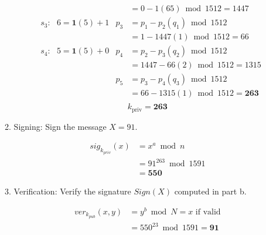 \documentclass[12pt]{article}
\newenvironment{answer}
{ \begin{tcolorbox}[halign=left]
    }
    {  
  \end{tcolorbox}
}
\begin{document}
\begin{enumerate}
\begin{enumerate}
\begin{answer}
\begin{align*}
          & & &= 0 - 1(65) \bmod 1512 = 1447 \\
          &s_3: \text{  }6 = \bm{1}(5) + 1 &p_3 &= p_1 - p_2(q_1) \bmod 1512 \\ 
          & & &= 1 - 1447(1) \bmod 1512 = 66 \\
          &s_4: \text{  }5 = \bm{1}(5) + 0 &p_4 &= p_2 - p_3(q_2) \bmod 1512 \\
          & & &= 1447 - 66(2) \bmod 1512 = 1315 \\
          & &p_5 &= p_3 - p_4(q_3) \bmod 1512 \\
          & & &= 66 - 1315(1) \bmod 1512 = \bm{263} \\
        \end{align*}
        \[ k_{\text{priv}} = \bm{263} \]
    \end{answer}
  \item Signing: Sign the message $X = 91$.  
    \begin{answer}
      \begin{align*}
        sig_{k_{priv}}(x) &= x^a \bmod n \\
                           &=  91^{263} \bmod 1591 \\ 
                           &= \bm{550}
      \end{align*}
    \end{answer}
  \item Verification: Verify the signature $Sign(X)$ computed in part b.
    \begin{answer}
      \begin{align*}
        ver_{k_{pub}}(x,y) &= y^b \bmod N = x  \text{ if valid} \\
                           &= 550^{23} \bmod 1591 = \bm{91} \\ 
      \end{align*}
    \end{answer}
  \end{enumerate}

\end{enumerate}  
\end{document}
